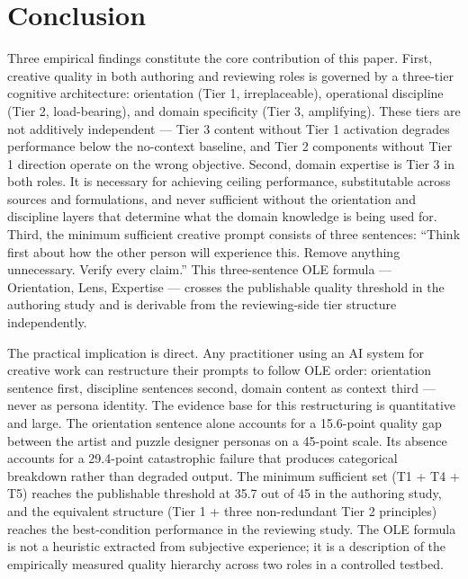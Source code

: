 \section{Conclusion}
\label{sec:conclusion}

Three empirical findings constitute the core contribution of this paper. First, creative
quality in both authoring and reviewing roles is governed by a three-tier cognitive
architecture: orientation (Tier 1, irreplaceable), operational discipline (Tier 2,
load-bearing), and domain specificity (Tier 3, amplifying). These tiers are not
additively independent --- Tier 3 content without Tier 1 activation degrades performance
below the no-context baseline, and Tier 2 components without Tier 1 direction operate on
the wrong objective. Second, domain expertise is Tier 3 in both roles. It is necessary
for achieving ceiling performance, substitutable across sources and formulations, and
never sufficient without the orientation and discipline layers that determine what the
domain knowledge is being used for. Third, the minimum sufficient creative prompt
consists of three sentences: ``Think first about how the other person will experience
this. Remove anything unnecessary. Verify every claim.'' This three-sentence OLE formula
--- Orientation, Lens, Expertise --- crosses the publishable quality threshold in
the authoring study and is derivable from the reviewing-side tier structure independently.

The practical implication is direct. Any practitioner using an AI system for creative
work can restructure their prompts to follow OLE order: orientation sentence first,
discipline sentences second, domain content as context third --- never as persona identity.
The evidence base for this restructuring is quantitative and large. The orientation
sentence alone accounts for a 15.6-point quality gap between the artist and puzzle
designer personas on a 45-point scale. Its absence accounts for a 29.4-point catastrophic
failure that produces categorical breakdown rather than degraded output. The minimum
sufficient set (T1 + T4 + T5) reaches the publishable threshold at 35.7 out of 45 in the
authoring study, and the equivalent structure (Tier 1 + three non-redundant Tier 2
principles) reaches the best-condition performance in the reviewing study. The OLE
formula is not a heuristic extracted from subjective experience; it is a description of
the empirically measured quality hierarchy across two roles in a controlled testbed.

